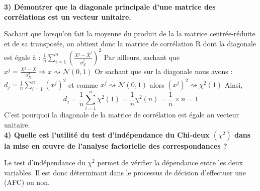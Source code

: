 \noindent \textbf{3) Démontrer que la diagonale principale d’une matrice des corrélations est un vecteur 
	unitaire.}

Sachant que lorsqu'on fait la moyenne du produit de la la matrice centrée-réduite et de sa transposée, on obtient donc la matrice de corrélation R dont la diagonale est égale à : $\displaystyle \frac{\displaystyle 1}{\displaystyle n}\sum_{i=1}^{n} \left(\displaystyle \frac{\displaystyle X^j-\overline{X}^j}{\displaystyle \sigma_{X}^j}\right)^2$ Par ailleurs, sachant que $x^j=\displaystyle \frac{\displaystyle X^j - \overline{X}}{\displaystyle \sigma_{X}^2} \Rightarrow x\rightsquigarrow \mathcal{N}(0,1)$ Or sachant que sur la diagonale nous avons : $d_j=\frac{\displaystyle 1}{\displaystyle n}\displaystyle \sum_{i=1}^{n} \left(x^j\right)^2$ et comme $x^j \rightsquigarrow \mathcal{N}(0,1)$ alors $\left(x^j\right)^2 \rightsquigarrow \chi^2(1)$ Ainsi, $$d_j = \frac{\displaystyle 1}{\displaystyle n}\displaystyle \sum_{i=1}^{n} \chi^2(1)=\frac{\displaystyle 1}{\displaystyle n}\chi^2(n)=\frac{\displaystyle 1}{\displaystyle n} \times n=1$$
C'est pourquoi la diagonale de la matrice de corrélation est égale au vecteur unitaire.\\

\noindent \textbf{4) Quelle est l’utilité du test d’indépendance du Chi-deux $(\chi^2)$ dans la mise en œuvre de l’analyse factorielle des correspondances ? }

Le test d'indépendance du $\chi^2$ permet de vérifier la dépendance entre les deux variables. Il est donc déterminant dans le processus de décision d'effectuer une (AFC) ou non.